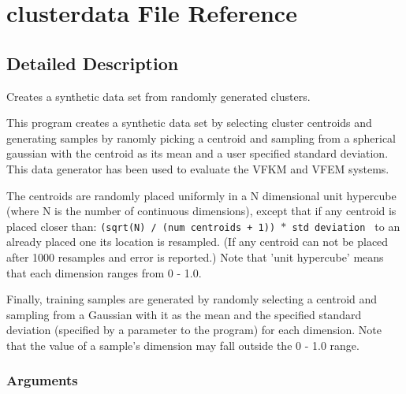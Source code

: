 \section{clusterdata File Reference}
\label{clusterdata}


\subsection{Detailed Description}
Creates a synthetic data set from randomly generated clusters. 

This program creates a synthetic data set by selecting cluster centroids and generating samples by ranomly picking a centroid and sampling from a spherical gaussian with the centroid as its mean and a user specified standard deviation. This data generator has been used to evaluate the VFKM and VFEM systems.

The centroids are randomly placed uniformly in a N dimensional unit hypercube (where N is the number of continuous dimensions), except that if any centroid is placed closer than: {\tt (sqrt(N) / (num centroids + 1)) $\ast$ std deviation } to an already placed one its location is resampled. (If any centroid can not be placed after 1000 resamples and error is reported.) Note that 'unit hypercube' means that each dimension ranges from 0 - 1.0.

Finally, training samples are generated by randomly selecting a centroid and sampling from a Gaussian with it as the mean and the specified standard deviation (specified by a parameter to the program) for each dimension. Note that the value of a sample's dimension may fall outside the 0 - 1.0 range.

\subsubsection*{Arguments}

